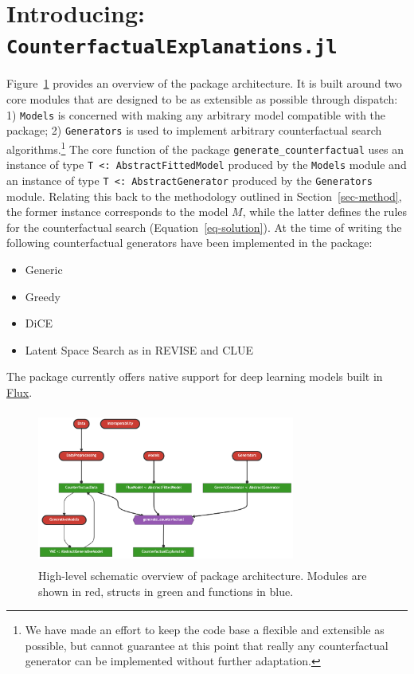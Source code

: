 \documentclass{juliacon}
\begin{document}
\hypertarget{sec-arch}{%
\section{\texorpdfstring{Introducing:
\texttt{CounterfactualExplanations.jl}}{Introducing: CounterfactualExplanations.jl}}\label{sec-arch}}

Figure~\ref{fig-arch} provides an overview of the package architecture.
It is built around two core modules that are designed to be as
extensible as possible through dispatch: 1) \texttt{Models} is concerned
with making any arbitrary model compatible with the package; 2)
\texttt{Generators} is used to implement arbitrary counterfactual search
algorithms.\footnote{We have made an effort to keep the code base a
  flexible and extensible as possible, but cannot guarantee at this
  point that really any counterfactual generator can be implemented
  without further adaptation.} The core function of the package
\texttt{generate\_counterfactual} uses an instance of type
\texttt{T\ \textless{}:\ AbstractFittedModel} produced by the
\texttt{Models} module and an instance of type
\texttt{T\ \textless{}:\ AbstractGenerator} produced by the
\texttt{Generators} module. Relating this back to the methodology
outlined in Section~\ref{sec-method}, the former instance corresponds to
the model \(M\), while the latter defines the rules for the
counterfactual search (Equation~\ref{eq-solution}). At the time of
writing the following counterfactual generators have been implemented in
the package:

\begin{itemize}
\item Generic \cite{wachter2017counterfactual}
\item Greedy \cite{schut2021generating}
\item DiCE \cite{mothilal2020explaining}
\item Latent Space Search as in REVISE \cite{joshi2019realistic} and CLUE \cite{antoran2020getting}
\end{itemize}

The package currently offers native support for deep learning models
built in \href{https://fluxml.ai/}{Flux}.

\begin{figure}

{\centering \includegraphics[width=3.33333in,height=2in]{www/pkg_architecture.png}

}

\caption{\label{fig-arch}High-level schematic overview of package
architecture. Modules are shown in red, structs in green and functions
in blue.}

\end{figure}
\end{document}
